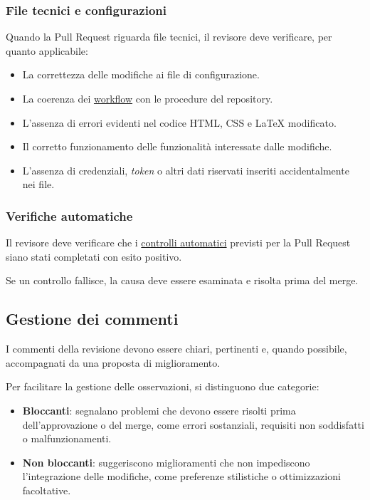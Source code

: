 \documentclass[11pt, a4paper]{article}
\begin{document}
\subsubsection{File tecnici e configurazioni}

Quando la Pull Request riguarda file tecnici, il revisore deve verificare, per quanto applicabile:
\begin{itemize}
    \item La correttezza delle modifiche ai file di configurazione.
    \item La coerenza dei \href{https://github.com/On-By-One-Team/On-By-One.github.io/blob/main/.github/workflows}{workflow} con le procedure del repository.
    \item L'assenza di errori evidenti nel codice HTML, CSS e LaTeX modificato.
    \item Il corretto funzionamento delle funzionalità interessate dalle modifiche.
    \item L'assenza di credenziali, \textit{token} o altri dati riservati inseriti accidentalmente nei file.
\end{itemize}

\subsubsection{Verifiche automatiche}

Il revisore deve verificare che i \href{https://github.com/On-By-One-Team/On-By-One.github.io/blob/main/.github/workflows}{controlli automatici} previsti per la Pull Request siano stati completati con esito positivo.

Se un controllo fallisce, la causa deve essere esaminata e risolta prima del merge.

\subsection{Gestione dei commenti}

I commenti della revisione devono essere chiari, pertinenti e, quando possibile, accompagnati da una proposta di miglioramento.

Per facilitare la gestione delle osservazioni, si distinguono due categorie:
\begin{itemize}
    \item \textbf{Bloccanti}: segnalano problemi che devono essere risolti prima dell'approvazione o del merge, come errori sostanziali, requisiti non soddisfatti o malfunzionamenti.
    \item \textbf{Non bloccanti}: suggeriscono miglioramenti che non impediscono l'integrazione delle modifiche, come preferenze stilistiche o ottimizzazioni facoltative.
\end{itemize}
\end{document}

